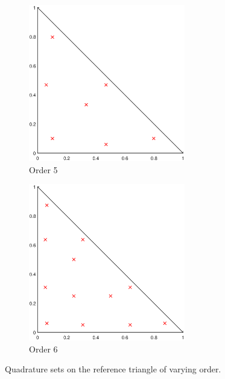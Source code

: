 \begin{figure}
{\begin{subfigure}[b]{0.475\textwidth}
		\includegraphics[width=0.75\textwidth]{figures/sec_BF/RefTriQuad_Q5.eps}
		\caption{Order 5}
	\end{subfigure}
	\hfill
	\begin{subfigure}[b]{0.475\textwidth}
		\centering
		\label{subfig::2DInt_RefTri_Q6}
		\includegraphics[width=0.75\textwidth]{figures/sec_BF/RefTriQuad_Q6.eps}
		\caption{Order 6}
	\end{subfigure}
}
\caption{Quadrature sets on the reference triangle of varying order.}
\label{fig::BF_2DIntegration_RefTri}
\end{figure}

